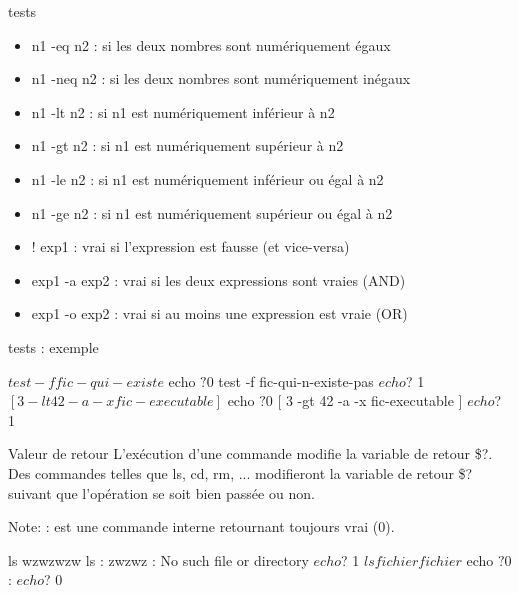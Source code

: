 \documentclass[10pt]{beamer}
\begin{document}
\begin{frame}{tests}
\begin{itemize}
\item \alert{n1 -eq n2} : si les deux nombres sont numériquement égaux
\item \alert{n1 -neq n2} : si les deux nombres sont numériquement inégaux
\item \alert{n1 -lt n2} : si n1 est numériquement inférieur à n2
\item \alert{n1 -gt n2} : si n1 est numériquement supérieur à n2
\item \alert{n1 -le n2} : si n1 est numériquement inférieur ou égal à n2
\item \alert{n1 -ge n2} : si n1 est numériquement supérieur ou égal à n2
\item \alert{! exp1} : vrai si l’expression est fausse (et vice-versa)
\item \alert{exp1 -a exp2} : vrai si les deux expressions sont vraies (AND)
\item \alert{exp1 -o exp2} : vrai si au moins une expression est vraie (OR)
\end{itemize}

\end{frame}


\begin{frame}[fragile]{tests : exemple}
\begin{mylisting}
$ test -f fic-qui-existe
$ echo $?
0
$ test -f fic-qui-n-existe-pas
$ echo $?
1
$ [ 3 -lt 42 -a -x fic-executable ]
$ echo $?
0
$ [ 3 -gt 42 -a -x fic-executable ]
$ echo $?
1
$
$
\end{mylisting}
\end{frame}


\begin{frame}[fragile]{Valeur de retour}
L’exécution d’une commande modifie la variable de retour \$?. Des commandes telles que ls, cd, rm, ... modifieront la variable de retour \$? suivant que l’opération se soit bien passée ou non.

Note: \alert{:} est une commande interne retournant toujours vrai (0).
\pause

\begin{mylisting}
ls wzwzwzw
ls : zwzwz : No such file or directory
$ echo $?
1
$ ls fichier
fichier
$ echo $?
0
$ :
$ echo $?
0
\end{mylisting}
\end{frame}
\end{document}
